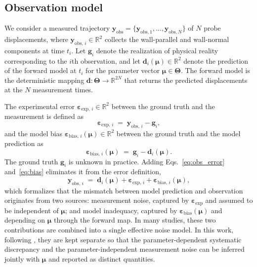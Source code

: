 \documentclass{elsarticle}
\renewcommand{\vec}[1]{\boldsymbol{#1}}
\newcommand{\params}{\boldsymbol{\mu}}
\newcommand{\paramspace}{\boldsymbol{\Theta}}
\begin{document}
\subsection{Observation model}
\label{subsec:obs_model}

We consider a measured trajectory
$\vec{y}_{\mathrm{obs}} = \{\vec{y}_{\mathrm{obs},1},\dots,
\vec{y}_{\mathrm{obs},N}\}$ of $N$ probe displacements, where
$\vec{y}_{\mathrm{obs},\,i} \in \mathbb{R}^{2}$ collects the
wall-parallel and wall-normal components at time
$t_{i}$. Let $\vec{g}_{i}$ denote the realization of physical reality
corresponding to the $i$th observation, and let
$\vec{d}_{i}(\params) \in \mathbb{R}^{2}$ denote the prediction of the
forward model at $t_{i}$ for the parameter vector
$\params \in \paramspace$. The forward model is the deterministic
mapping $\vec{d}: \paramspace \to \mathbb{R}^{2N}$ that returns the
predicted displacements at the $N$ measurement times.

The experimental error
$\vec{\varepsilon}_{\mathrm{exp},\,i} \in \mathbb{R}^{2}$ between the
ground truth and the measurement is defined as
\begin{equation}
\vec{\varepsilon}_{\mathrm{exp},\,i}
\;=\; \vec{y}_{\mathrm{obs},\,i} -\vec{g}_{i},
\label{eq:obs_error}
\end{equation}
and the model bias
$\vec{\varepsilon}_{\mathrm{bias},\,i}(\params) \in \mathbb{R}^{2}$
between the ground truth and the model prediction as
\begin{equation}
\vec{\varepsilon}_{\mathrm{bias},\,i}(\params)
\;=\; \vec{g}_{i} - \vec{d}_{i}(\params).
\label{eq:bias}
\end{equation}
The ground truth $\vec{g}_{i}$ is unknown in practice. Adding
Eqs.~\eqref{eq:obs_error} and~\eqref{eq:bias} eliminates it from the
error definition,
\begin{equation}
\vec{y}_{\mathrm{obs},\,i}
\;=\;
\vec{d}_{i}(\params)
+
\vec{\varepsilon}_{\mathrm{exp},\,i}
+
\vec{\varepsilon}_{\mathrm{bias},\,i}(\params),
\label{eq:error_decomposition}
\end{equation}
which formalizes that the mismatch between model prediction and
observation originates from two sources: measurement noise, captured
by $\vec{\varepsilon}_{\mathrm{exp}}$ and assumed to be independent of
$\params$; and model inadequacy, captured by
$\vec{\varepsilon}_{\mathrm{bias}}(\params)$ and depending on $\params$
through the forward map. In many studies, these two contributions are
combined into a single effective noise model. In this work, following
\cite{kennedy2001calibration}, they are kept separate so that the
parameter-dependent systematic discrepancy and the
parameter-independent measurement noise can be inferred
jointly with $\params$ and reported as distinct quantities.
\end{document}
